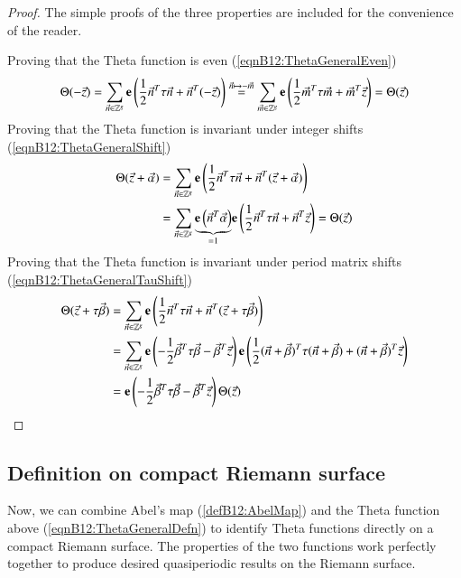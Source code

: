 \begin{proof} The simple proofs of the three properties are included for the convenience of the reader.

    Proving that the Theta function is even (\ref{eqnB12:ThetaGeneralEven})
    \begin{align}
        \Theta(-\vec z) = \sum_{\vec n \in \mathbb Z^g} \mathbf{e}\left(\frac{1}{2} \vec n^T \tau \vec n + \vec n^T (-\vec z)\right) \overset{\vec n \mapsto -\vec m}{=} \sum_{\vec m \in \mathbb Z^g} \mathbf{e}\left(\frac{1}{2} \vec m^T \tau \vec m + \vec m^T \vec z\right) = \Theta(\vec z)
    \end{align}
    Proving that the Theta function is invariant under integer shifts (\ref{eqnB12:ThetaGeneralShift})
    \begin{align}
        \Theta(\vec z + \vec \alpha) &= \sum_{\vec n \in \mathbb Z^g} \mathbf{e}\left(\frac{1}{2} \vec n^T \tau \vec n + \vec n^T (\vec z + \vec \alpha)\right) \\ &=
        \sum_{\vec n \in \mathbb Z^g} \underset{=1}{\underbrace{\mathbf{e}\left(\vec n^T \vec \alpha\right)}} \mathbf{e}\left(\frac{1}{2} \vec n^T \tau \vec n + \vec n^T \vec z\right) = \Theta(\vec z)
    \end{align}
    Proving that the Theta function is invariant under period matrix shifts (\ref{eqnB12:ThetaGeneralTauShift})
    \begin{align}
        \Theta(\vec z + \tau \vec \beta) &= \sum_{\vec n \in \mathbb Z^g} \mathbf{e}\left(\frac{1}{2} \vec n^T \tau \vec n + \vec n^T (\vec z + \tau \vec \beta)\right) \\ &=
        \sum_{\vec n \in \mathbb Z^g}
        \mathbf{e}\left(-\frac{1}{2} \vec \beta^T \tau \vec \beta - \vec \beta^T \vec z\right) \mathbf{e}\left(\frac{1}{2} (\vec n+\vec \beta)^T \tau (\vec n+\vec \beta) + (\vec n+\vec \beta)^T \vec z\right)\\
        &=  \mathbf{e}\left(-\frac{1}{2} \vec \beta^T \tau \vec \beta - \vec \beta^T \vec z\right) \Theta(\vec z) 
    \end{align}
\end{proof}

\subsection{Definition on compact Riemann surface}
Now, we can combine Abel's map (\ref{defB12:AbelMap}) and the Theta function above (\ref{eqnB12:ThetaGeneralDefn}) to identify Theta functions directly on a compact Riemann surface. The properties of the two functions work perfectly together to produce desired quasiperiodic results on the Riemann surface.

